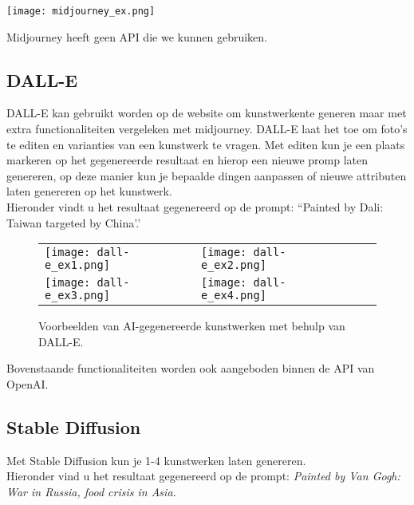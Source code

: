\begin{center}
    \texttt{[image: midjourney\_ex.png]}
    \label{fig:midjourney_ex.png}
\end{center}

Midjourney heeft geen API die we kunnen gebruiken.

\subsection{ DALL-E}
DALL-E kan gebruikt worden op de website om kunstwerkente generen maar met extra functionaliteiten vergeleken met midjourney. DALL-E laat het toe om foto's te editen en varianties van een kunstwerk te vragen. Met editen kun je een plaats markeren op het gegenereerde resultaat en hierop een nieuwe promp laten genereren, op deze manier kun je bepaalde dingen aanpassen of nieuwe attributen laten genereren op het kunstwerk. \\

Hieronder vindt u het resultaat gegenereerd op de prompt: ``Painted by Dali: Taiwan targeted by China'.' \\

\begin{figure}[h!]
    \centering
    \begin{tabular}{llll}
        \texttt{[image: dall-e\_ex1.png]} &
        \texttt{[image: dall-e\_ex2.png]} \\
        \texttt{[image: dall-e\_ex3.png]} &
        \texttt{[image: dall-e\_ex4.png]}
    \end{tabular}
    \caption{Voorbeelden van AI-gegenereerde kunstwerken met behulp van DALL-E.}
    \label{fig:examples}
\end{figure}


 Bovenstaande functionaliteiten worden ook aangeboden binnen de API van OpenAI.
\pagebreak

\subsection{Stable Diffusion}
Met Stable Diffusion kun je 1-4 kunstwerken laten genereren. \\

Hieronder vind u het resultaat gegenereerd op de prompt:  \emph{Painted by Van Gogh: War in Russia, food crisis in Asia.}

